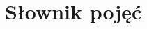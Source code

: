 \documentclass[11pt,wide]{mwart}
\begin{document}
  
\section{\Large Słownik pojęć}
\begin{multicols}{2}
  
\end{multicols}
\end{document}
